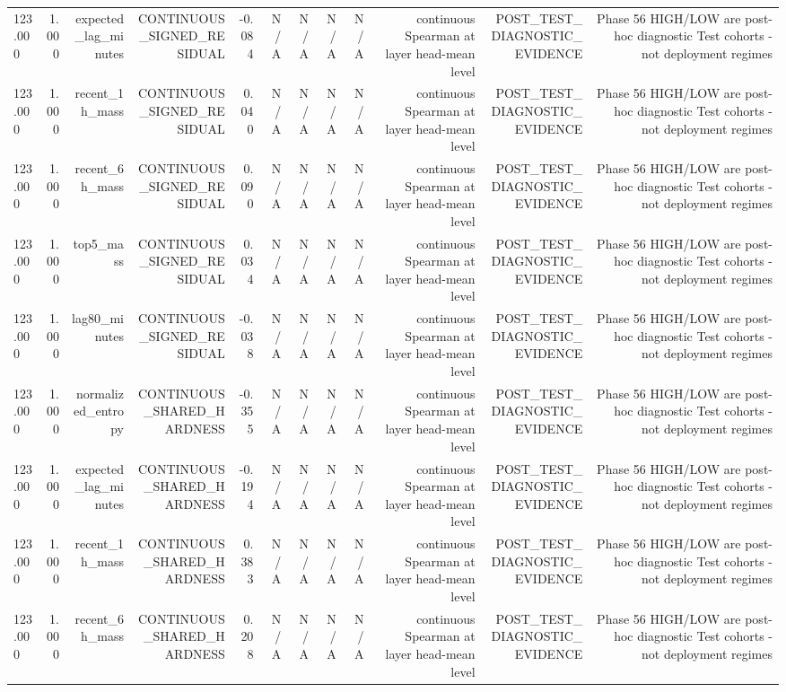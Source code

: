 \begin{table}[h!]
\begin{tabular}{lrrrrrrrrrrr}
123.000 & 1.000 & expected\_lag\_minutes & CONTINUOUS\_SIGNED\_RESIDUAL & -0.084 & N/A & N/A & N/A & N/A & continuous Spearman at layer head-mean level & POST\_TEST\_DIAGNOSTIC\_EVIDENCE & Phase 56 HIGH/LOW are post-hoc diagnostic Test cohorts - not deployment regimes \\
123.000 & 1.000 & recent\_1h\_mass & CONTINUOUS\_SIGNED\_RESIDUAL & 0.040 & N/A & N/A & N/A & N/A & continuous Spearman at layer head-mean level & POST\_TEST\_DIAGNOSTIC\_EVIDENCE & Phase 56 HIGH/LOW are post-hoc diagnostic Test cohorts - not deployment regimes \\
123.000 & 1.000 & recent\_6h\_mass & CONTINUOUS\_SIGNED\_RESIDUAL & 0.090 & N/A & N/A & N/A & N/A & continuous Spearman at layer head-mean level & POST\_TEST\_DIAGNOSTIC\_EVIDENCE & Phase 56 HIGH/LOW are post-hoc diagnostic Test cohorts - not deployment regimes \\
123.000 & 1.000 & top5\_mass & CONTINUOUS\_SIGNED\_RESIDUAL & 0.034 & N/A & N/A & N/A & N/A & continuous Spearman at layer head-mean level & POST\_TEST\_DIAGNOSTIC\_EVIDENCE & Phase 56 HIGH/LOW are post-hoc diagnostic Test cohorts - not deployment regimes \\
123.000 & 1.000 & lag80\_minutes & CONTINUOUS\_SIGNED\_RESIDUAL & -0.038 & N/A & N/A & N/A & N/A & continuous Spearman at layer head-mean level & POST\_TEST\_DIAGNOSTIC\_EVIDENCE & Phase 56 HIGH/LOW are post-hoc diagnostic Test cohorts - not deployment regimes \\
123.000 & 1.000 & normalized\_entropy & CONTINUOUS\_SHARED\_HARDNESS & -0.355 & N/A & N/A & N/A & N/A & continuous Spearman at layer head-mean level & POST\_TEST\_DIAGNOSTIC\_EVIDENCE & Phase 56 HIGH/LOW are post-hoc diagnostic Test cohorts - not deployment regimes \\
123.000 & 1.000 & expected\_lag\_minutes & CONTINUOUS\_SHARED\_HARDNESS & -0.194 & N/A & N/A & N/A & N/A & continuous Spearman at layer head-mean level & POST\_TEST\_DIAGNOSTIC\_EVIDENCE & Phase 56 HIGH/LOW are post-hoc diagnostic Test cohorts - not deployment regimes \\
123.000 & 1.000 & recent\_1h\_mass & CONTINUOUS\_SHARED\_HARDNESS & 0.383 & N/A & N/A & N/A & N/A & continuous Spearman at layer head-mean level & POST\_TEST\_DIAGNOSTIC\_EVIDENCE & Phase 56 HIGH/LOW are post-hoc diagnostic Test cohorts - not deployment regimes \\
123.000 & 1.000 & recent\_6h\_mass & CONTINUOUS\_SHARED\_HARDNESS & 0.208 & N/A & N/A & N/A & N/A & continuous Spearman at layer head-mean level & POST\_TEST\_DIAGNOSTIC\_EVIDENCE & Phase 56 HIGH/LOW are post-hoc diagnostic Test cohorts - not deployment regimes \\

\end{tabular}
\end{table}
